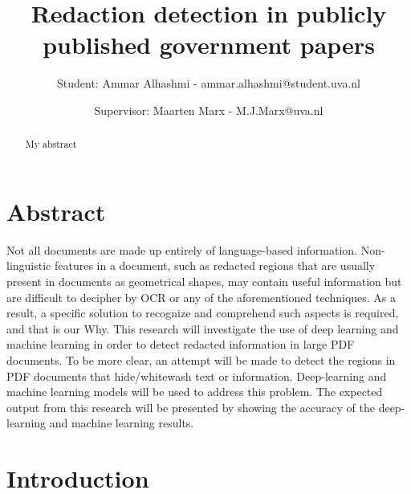 \documentclass[sigconf,authordraft]{acmart}
\begin{document}
\title{Redaction detection in publicly published government papers} %
\author{Student: Ammar Alhashmi - ammar.alhashmi@student.uva.nl}
\author{Supervisor: Maarten Marx - M.J.Marx@uva.nl}

\maketitle


\begin{abstract}
My abstract
\end{abstract}


\section{Abstract}
Not all documents are made up entirely of language-based information. Non-linguistic features in a document, such as redacted regions that are usually present in documents as geometrical shapes, may contain useful information but are difficult to decipher by OCR or any of the aforementioned techniques. As a result, a specific solution to recognize and comprehend such aspects is required, and that is our Why. This research will investigate the use of deep learning and machine learning  in order to detect redacted information in large PDF documents. To be more clear, an attempt will be
made to detect the regions in PDF documents that hide/whitewash text or information.
Deep-learning and machine learning models will be used to address this problem. The expected output from this research will be presented by showing the accuracy of the deep-learning and machine learning results. 

\section{Introduction}
\end{document}
